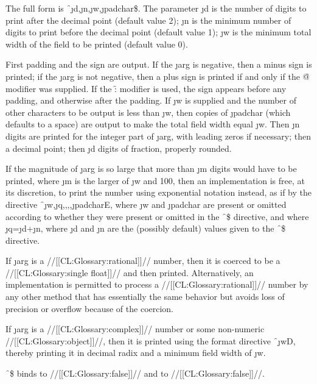 The full form is \f{~\j{d},\j{n},\j{w},\j{padchar}\$}.
The parameter \j{d} is the number
of digits to print after the decimal point (default value 2);
\j{n} is the minimum number of digits to print before the decimal
point (default value 1);
\j{w} is the minimum total width of the field to be printed (default
value 0).


First padding and the sign are output.
If the \j{arg} is negative, then a minus sign is printed;
if the \j{arg} is not negative, then a plus sign is printed
if and only if the \f{@} modifier was supplied.  
If the \f{:} modifier is used, the sign appears before any padding,
and otherwise after the padding.
If \j{w} is supplied and the number of other characters to be output
is less than \j{w}, then copies of \j{padchar} (which defaults
to a space) are output to
make the total field width equal \j{w}.
Then \j{n} digits are printed for the integer part of \j{arg},
with leading zeros if necessary; then a decimal point;
then \j{d} digits of fraction, properly rounded.


If the magnitude of \j{arg} is so large that more than \j{m} digits would
have to be printed, where \j{m} is the larger of \j{w} and 100, then an
implementation is free, at its discretion, to print the number using
exponential notation instead, as if by the directive
\f{~\j{w},\j{q},,,,\j{padchar}E}, where \j{w} and \j{padchar} are
present or omitted according to whether they were present or omitted in
the \f{~\$} directive, and where \j{q}=\j{d}+\j{n},
where \j{d} and \j{n} are the (possibly default) values given to the
\f{~\$} directive.


If \j{arg} is a //[[CL:Glossary:rational]]// 
number, then it is coerced to be a //[[CL:Glossary:single float]]//
and then printed.  Alternatively, an implementation is permitted to
process a //[[CL:Glossary:rational]]// number by any 
other method that has essentially the
same behavior but avoids loss of precision or overflow
because of the coercion.


If \j{arg} is a //[[CL:Glossary:complex]]// number or some non-numeric
//[[CL:Glossary:object]]//,
then it is printed using the format directive \f{~\j{w}D},
thereby printing it in decimal radix and a minimum field width of \j{w}.

\f{~\$} binds  to //[[CL:Glossary:false]]//
 and  to //[[CL:Glossary:false]]//.




